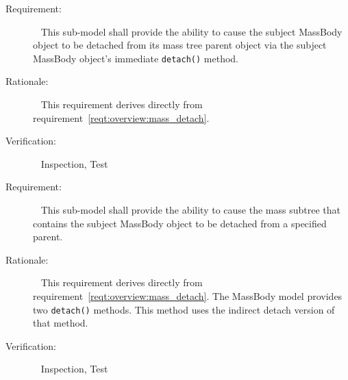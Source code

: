 \label{reqt:BodyAttach_Detach:detach_immediate}
\begin{description}
  \item[Requirement:]\ \newline
    This sub-model shall provide the ability to cause the subject MassBody
    object to be detached from its mass tree parent object via the subject
    MassBody object's immediate {\tt detach()} method.
  \item[Rationale:]\ \newline
    This requirement derives directly from
    requirement~\ref{reqt:overview:mass_detach}.
  \item[Verification:]\ \newline
    Inspection, Test
\end{description}

\label{reqt:BodyAttach_Detach:detach_specific}
\begin{description}
  \item[Requirement:]\ \newline
    This sub-model shall provide the ability to cause the mass subtree
    that contains the subject MassBody object to be detached
    from a specified parent.
  \item[Rationale:]\ \newline
    This requirement derives directly from
    requirement~\ref{reqt:overview:mass_detach}.
    The MassBody model provides two {\tt detach()} methods.
    This method uses the indirect detach version of that method.
  \item[Verification:]\ \newline
    Inspection, Test
\end{description}
